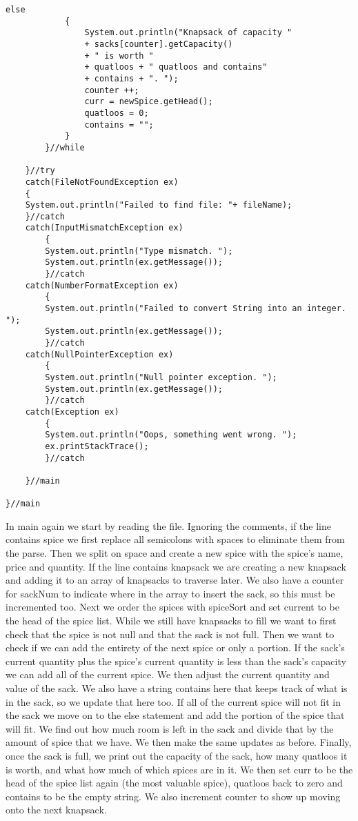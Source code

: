 \documentclass{article}
\begin{document}
\begin{lstlisting}[frame =single,
backgroundcolor = \color{grey!12}]
			else
			{
				System.out.println("Knapsack of capacity " 
				+ sacks[counter].getCapacity()
				+ " is worth "
				+ quatloos + " quatloos and contains" 
				+ contains + ". ");
				counter ++;
				curr = newSpice.getHead();
				quatloos = 0;
				contains = "";
			}
		}//while
		
	}//try
	catch(FileNotFoundException ex)
	{
	System.out.println("Failed to find file: "+ fileName);
	}//catch
	catch(InputMismatchException ex)
		{
		System.out.println("Type mismatch. ");
		System.out.println(ex.getMessage());
		}//catch
	catch(NumberFormatException ex)
		{
		System.out.println("Failed to convert String into an integer. ");
		System.out.println(ex.getMessage());
		}//catch
	catch(NullPointerException ex)
		{
		System.out.println("Null pointer exception. ");
		System.out.println(ex.getMessage());
		}//catch
	catch(Exception ex)
		{
		System.out.println("Oops, something went wrong. ");
		ex.printStackTrace();
		}//catch
	
	}//main
	
}//main
\end{lstlisting}
\large
In main again we start by reading the file. Ignoring the comments, if the line contains spice we first replace all semicolons with spaces to eliminate them from the parse. Then we split on space and create a new spice with the spice's name, price and quantity. If the line contains knapsack we are creating a new knapsack and adding it to an array of knapsacks to traverse later. We also have a counter for sackNum to indicate where in the array to insert the sack, so this must be incremented too. Next we order the spices with spiceSort and set current to be the head of the spice list. While we still have knapsacks to fill we want to first check that the spice is not null and that the sack is not full. Then we want to check if we can add the entirety of the next spice or only a portion. If the sack's current quantity plus the spice's current quantity is less than the sack's capacity we can add all of the current spice. We then adjust the current quantity and value of the sack. We also have a string contains here that keeps track of what is in the sack, so we update that here too. If all of the current spice will not fit in the sack we move on to the else statement and add the portion of the spice that will fit. We find out how much room is left in the sack and divide that by the amount of spice that we have. We then make the same updates as before. Finally, once the sack is full, we print out the capacity of the sack, how many quatloos it is worth, and what how much of which spices are in it. We then set curr to be the head of the spice list again (the most valuable spice), quatloos back to zero and contains to be the empty string. We also increment counter to show up moving onto the next knapsack. 
\end{document}
